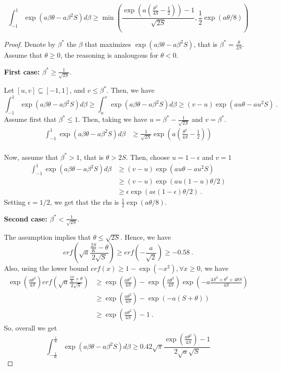 \documentclass{colt2016_empty} %
\begin{document}
\begin{theorem}
\[
\int_{-1}^{1} \exp(a \beta \theta - a \beta^2 S) d\beta 
\geq \min\left(\frac{\exp(a(\frac{\theta^2}{4 S}-\frac{1}{2})) -1}{\sqrt{2S}},\frac{1}{2} \exp(a \theta/8)\right)
\]
\end{theorem}
%
\begin{proof}
Denote  by $\beta^*$ the $\beta$ that maximizes $\exp(a \beta \theta - a \beta^2 S)$, that is $\beta^*=\tfrac{\theta}{2 S}$.
Assume that $\theta\geq0$, the reasoning is analougous for $\theta<0$.

\textbf{First case: $\beta^*\geq \tfrac{1}{\sqrt{2 S}}$}.

Let $[u,v] \subseteq [-1,1]$, and $v \leq \beta^*$.
Then, we have
\[
\int_{-1}^{1} \exp(a \beta \theta - a \beta^2 S) d\beta 
\geq \int_{u}^{v} \exp(a \beta \theta - a \beta^2 S) d\beta
\geq (v-u) \exp(a u \theta - a u^2 S)~.
\]
Assume first that $\beta^*\leq 1$. Then, taking  we have $u=\beta^*-\tfrac{1}{\sqrt{2S}}$ and $v=\beta^*$.
\begin{align}
\int_{-1}^{1} \exp(a \beta \theta - a \beta^2 S) d\beta 
&\geq \frac{1}{\sqrt{2S}} \exp(a (\tfrac{\theta^2}{4 S}-\tfrac{1}{2})) \\
\end{align}

Now, assume that $\beta^*>1$, that is $\theta>2 S$. Then, choose $u=1-\epsilon$ and $v=1$
\begin{align}
\int_{-1}^{1} \exp(a \beta \theta - a \beta^2 S) d\beta 
&\geq (v-u) \exp(a u \theta - a u^2 S) \\
&\geq (v-u) \exp(a u(1 - u )\theta/2) \\
&\geq \epsilon \exp(a \epsilon(1 - \epsilon )\theta/2)~.
\end{align}
Setting $\epsilon=1/2$, we get that the rhs is $\frac{1}{2} \exp(a \theta/8)$.

\textbf{Second case: $\beta^*< \tfrac{1}{\sqrt{2 S}}$}.

The assumption implies that $\theta \leq \sqrt{2 S}$.
Hence, we have
\[
erf(\sqrt{a}\frac{\frac{2 S}{K}-\theta}{2 \sqrt{S}}) \geq erf(-\frac{a}{\sqrt{2}}) \geq -0.58~.
\]
Also, using the lower bound $erf(x)\geq 1-\exp(-x^2), \forall x\geq0$, we have
\begin{align}
\exp(\frac{a \theta^2}{4 S}) erf(\sqrt{a}\frac{\frac{2 S}{K}+\theta}{2 \sqrt{S}}) 
&\geq \exp(\frac{a \theta^2}{4 S})-\exp(\frac{a \theta^2}{4 S})\exp(-a \frac{4S^2+\theta^2+4 \theta S }{4 S}) \\
&\geq \exp(\frac{a \theta^2}{4 S})-\exp(-a (S+ \theta )) \\
&\geq \exp(\frac{a \theta^2}{4 S})-1~.
\end{align}
So, overall we get
\[
\int_{-\tfrac{1}{K}}^{\tfrac{1}{K}} \exp(a \beta \theta - a \beta^2 S) d\beta 
\geq  0.42 \sqrt{\pi} \frac{\exp(\frac{a \theta^2}{4 S}) -1}{2 \sqrt{a} \sqrt{S}}
\]
\end{proof}


\end{document}
